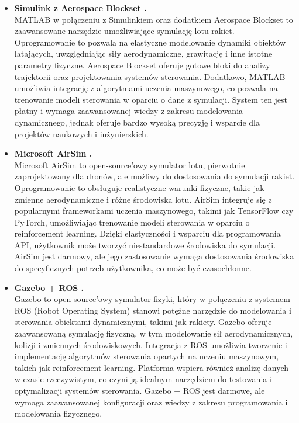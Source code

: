 \begin{itemize}
    \item \textbf{Simulink z Aerospace Blockset
    \cite{mathworks_aerospace_blockset}.} \\
    MATLAB w połączeniu z Simulinkiem oraz dodatkiem Aerospace Blockset to zaawansowane narzędzie umożliwiające symulację lotu rakiet. Oprogramowanie to pozwala na elastyczne modelowanie dynamiki obiektów latających, uwzględniając siły aerodynamiczne, grawitację i inne istotne parametry fizyczne. Aerospace Blockset oferuje gotowe bloki do analizy trajektorii oraz projektowania systemów sterowania. Dodatkowo, MATLAB umożliwia integrację z algorytmami uczenia maszynowego, co pozwala na trenowanie modeli sterowania w oparciu o dane z symulacji. System ten jest płatny i wymaga zaawansowanej wiedzy z zakresu modelowania dynamicznego, jednak oferuje bardzo wysoką precyzję i wsparcie dla projektów naukowych i inżynierskich.

    \item \textbf{Microsoft AirSim \cite{airsim}.} \\
    Microsoft AirSim to open-source'owy symulator lotu, pierwotnie zaprojektowany dla dronów, ale możliwy do dostosowania do symulacji rakiet. Oprogramowanie to obsługuje realistyczne warunki fizyczne, takie jak zmienne aerodynamiczne i różne środowiska lotu. AirSim integruje się z popularnymi frameworkami uczenia maszynowego, takimi jak TensorFlow czy PyTorch, umożliwiając trenowanie modeli sterowania w oparciu o reinforcement learning. Dzięki elastyczności i wsparciu dla programowania API, użytkownik może tworzyć niestandardowe środowiska do symulacji. AirSim jest darmowy, ale jego zastosowanie wymaga dostosowania środowiska do specyficznych potrzeb użytkownika, co może być czasochłonne.

    \item \textbf{Gazebo \cite{gazebo_ros} + ROS \cite{ros_gazebo}.} \\
    Gazebo to open-source'owy symulator fizyki, który w połączeniu z systemem ROS (Robot Operating System) stanowi potężne narzędzie do modelowania i sterowania obiektami dynamicznymi, takimi jak rakiety. Gazebo oferuje zaawansowaną symulację fizyczną, w tym modelowanie sił aerodynamicznych, kolizji i zmiennych środowiskowych. Integracja z ROS umożliwia tworzenie i implementację algorytmów sterowania opartych na uczeniu maszynowym, takich jak reinforcement learning. Platforma wspiera również analizę danych w czasie rzeczywistym, co czyni ją idealnym narzędziem do testowania i optymalizacji systemów sterowania. Gazebo + ROS jest darmowe, ale wymaga zaawansowanej konfiguracji oraz wiedzy z zakresu programowania i modelowania fizycznego.
\end{itemize}

